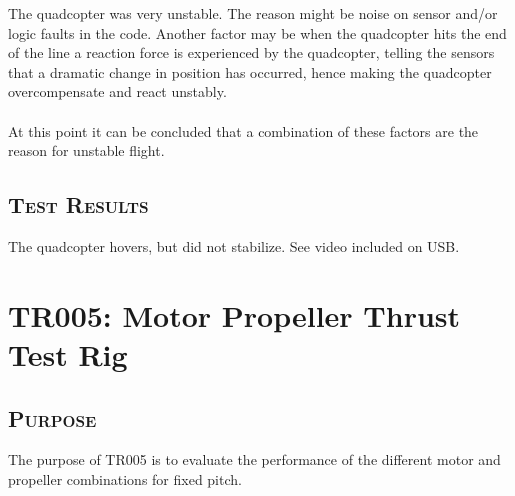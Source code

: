 The quadcopter was very unstable. The reason might be noise on sensor and/or logic faults in the code. Another factor may be when the quadcopter hits the end of the line a reaction force is experienced by the quadcopter, telling the sensors that a dramatic change in position has occurred, hence making the quadcopter overcompensate and react unstably. 
\\\\
At this point it can be concluded that a combination of these factors are the reason for unstable flight.

\subsection*{\textsc{\medium Test Results}}
The quadcopter hovers, but did not stabilize. See video included on USB.
\newpage

\section{TR005: Motor Propeller Thrust Test Rig}
         {}

\subsection*{\textsc{\medium Purpose}}
The purpose of TR005 is to evaluate the performance of the different motor and propeller combinations for fixed pitch. 

